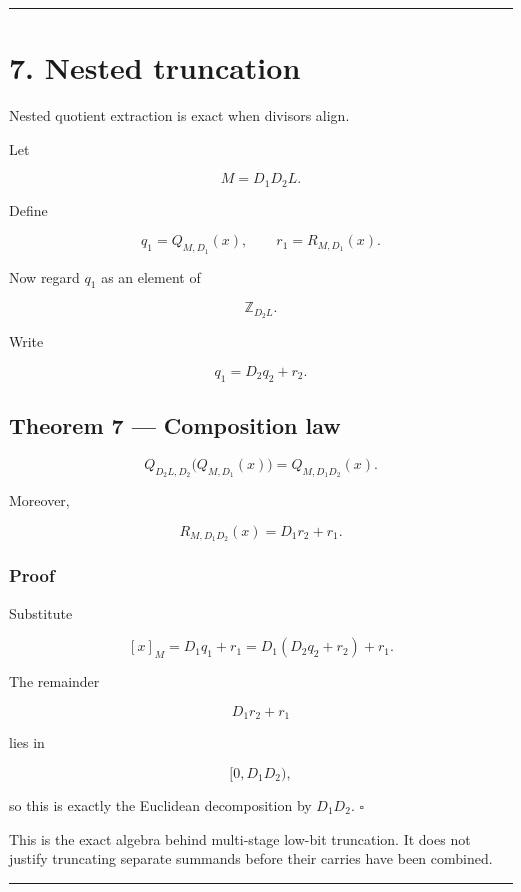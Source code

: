 \documentclass[11pt,a4paper]{article}
\begin{document}
\begin{center}\rule{0.5\linewidth}{0.5pt}\end{center}

\section{7. Nested truncation}\label{nested-truncation}

Nested quotient extraction is exact when divisors align.

Let

\[
M=D_1D_2L.
\]

Define

\[
q_1=Q_{M,D_1}(x),\qquad
r_1=R_{M,D_1}(x).
\]

Now regard \(q_1\) as an element of

\[
\mathbb Z_{D_2L}.
\]

Write

\[
q_1=D_2q_2+r_2.
\]

\subsection{Theorem 7 --- Composition law}\label{theorem-7-composition-law}

\[
\boxed{
Q_{D_2L,D_2}
\bigl(Q_{M,D_1}(x)\bigr)
=
Q_{M,D_1D_2}(x).
}
\]

Moreover,

\[
\boxed{
R_{M,D_1D_2}(x)
=
D_1r_2+r_1.
}
\]

\subsubsection{Proof}\label{proof-6}

Substitute

\[
[x]_M
=
D_1q_1+r_1
=
D_1(D_2q_2+r_2)+r_1.
\]

The remainder

\[
D_1r_2+r_1
\]

lies in

\[
[0,D_1D_2),
\]

so this is exactly the Euclidean decomposition by \(D_1D_2\). \(\square\)

This is the exact algebra behind multi-stage low-bit truncation. It does not justify truncating separate summands before their carries have been combined.

\begin{center}\rule{0.5\linewidth}{0.5pt}\end{center}
\end{document}
